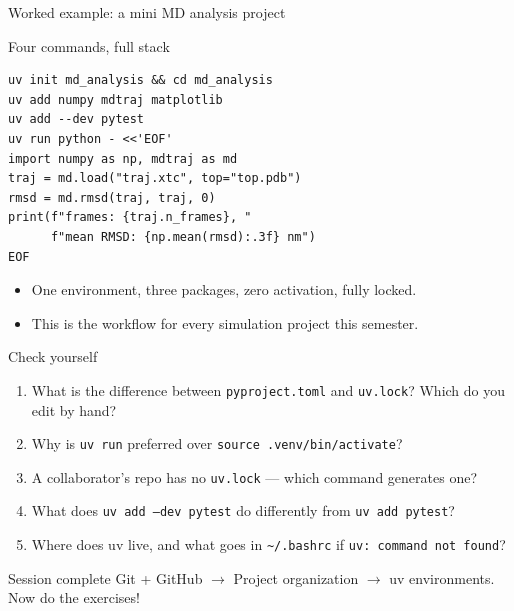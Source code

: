 \documentclass[aspectratio=169]{beamer}
\begin{document}
\begin{frame}[fragile]{Worked example: a mini MD analysis project}
  \begin{block}{Four commands, full stack}
    \begin{lstlisting}
uv init md_analysis && cd md_analysis
uv add numpy mdtraj matplotlib
uv add --dev pytest
uv run python - <<'EOF'
import numpy as np, mdtraj as md
traj = md.load("traj.xtc", top="top.pdb")
rmsd = md.rmsd(traj, traj, 0)
print(f"frames: {traj.n_frames}, "
      f"mean RMSD: {np.mean(rmsd):.3f} nm")
EOF
    \end{lstlisting}
  \end{block}
  \begin{itemize}
    \item One environment, three packages, zero activation, fully locked.
    \item This is the workflow for every simulation project this semester.
  \end{itemize}
\end{frame}

\begin{frame}{Check yourself}
  \begin{enumerate}
    \item What is the difference between \texttt{pyproject.toml} and \texttt{uv.lock}?
          Which do you edit by hand?
    \item Why is \texttt{uv run} preferred over \texttt{source .venv/bin/activate}?
    \item A collaborator's repo has no \texttt{uv.lock} --- which command generates one?
    \item What does \texttt{uv add --dev pytest} do differently from \texttt{uv add pytest}?
    \item Where does uv live, and what goes in \texttt{\textasciitilde/.bashrc} if
          \texttt{uv: command not found}?
  \end{enumerate}
  \vspace{0.3cm}
  \begin{block}{Session complete}
    Git + GitHub \quad $\rightarrow$ \quad Project organization \quad $\rightarrow$
    \quad uv environments. Now do the exercises!
  \end{block}
\end{frame}
\end{document}
